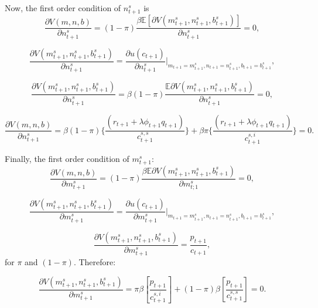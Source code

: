 \documentclass[12pt]{article}%
\begin{document}
Now, the first order condition of $n^s_{t+1}$ is 
\begin{equation}
\frac{\partial V(m,n,b)}{\partial n^s_{t+1}}=
(1-\pi)\frac{\beta \mathbb{E}[\partial V(m^s_{t+1}, n^s_{t+1}, b^s_{t+1})]}{\partial n^s_{t+1}}
=0,
\end{equation}

\begin{equation}
\frac{\partial V(m^s_{t+1},n^s_{t+1},b^s_{t+1})}{\partial n^s_{t+1}}=
\frac{\partial u(c_{t+1})}{\partial n^s_{t+1}}
\bigg|_{m_{t+1}=m^s_{t+1},
n_{t+1}=n^s_{t+1},b_{t+1}=b^s_{t+1}},
\end{equation}

\begin{equation}
\frac{\partial V(m^s_{t+1},n^s_{t+1},b^s_{t+1})}{\partial n^s_{t+1}}=
\beta (1-\pi) \frac{\mathbb{E}\partial V(m^s_{t+1}, n^s_{t+1}, b^s_{t+1})}{\partial n^s_{t+1}}
= 0,
\end{equation}

\begin{equation}
\frac{\partial V(m,n,b)}{\partial n^s_{t+1}}
= \beta (1-\pi) \Big\{ \frac{(r_{t+1}+\lambda
\phi_{t+1}q_{t+1})}{c^{s,s}_{t+1}}\Big\}
+\beta \pi \Big\{ \frac{(r_{t+1}+\lambda \phi_{t+1}q_{t+1})}{c^{s,i}_{t+1}}
\Big\} = 0.
\end{equation}

Finally, the first order condition of $m^s_{t+1}$:
\begin{equation}
\frac{\partial V(m,n,b)}{\partial m^s_{t+1}}
= (1-\pi)\frac{\beta \mathbb{E}\partial V(m^s_{t+1}, n^s_{t+1}, b^s_{t+1})}{\partial m^s_{t;1}}
= 0,
\end{equation}

\begin{equation}
\frac{\partial V(m^s_{t+1},n^s_{t+1},b^s_{t+1})}{\partial m^s_{t+1}}=
\frac{\partial u(c_{t+1})}{\partial m^s_{t+1}}
\bigg|_{m_{t+1}=m^s_{t+1},
n_{t+1}=n^s_{t+1},b_{t+1}=b^s_{t+1}},
\end{equation}

\begin{equation}
\frac{\partial V(m^s_{t+1},n^s_{t+1},b^s_{t+1})}{\partial m^s_{t+1}}=
\frac{p_{t+1}}{c_{t+1}},
\end{equation}
for $\pi$ and $(1-\pi)$. Therefore:

\begin{equation}
\frac{\partial V(m^s_{t+1},n^s_{t+1},b^s_{t+1})}{\partial m^s_{t+1}}=
\pi \beta [\frac{p_{t+1}}{c^{s,i}_{t+1}}]+(1-\pi)
 \beta [\frac{p_{t+1}}{c^{s,s}_{t+1}}] = 0.
\end{equation}
\end{document}
